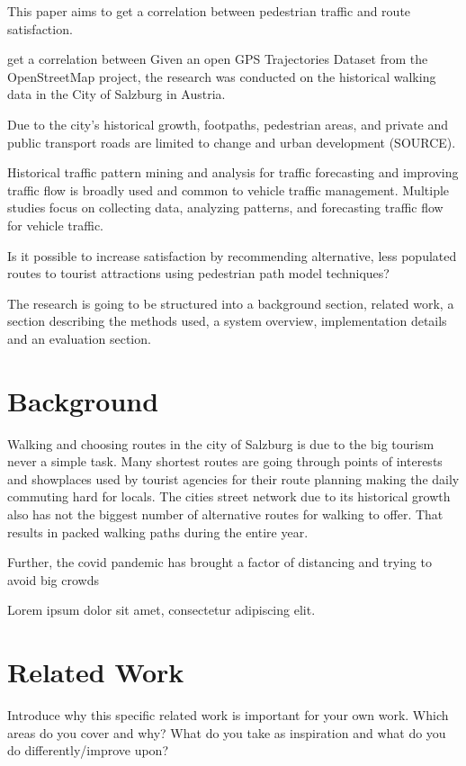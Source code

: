 This paper aims to get a correlation between pedestrian traffic and route satisfaction.


get a correlation between 
Given an open GPS Trajectories Dataset from the OpenStreetMap project, the research was conducted on the historical walking data in the City of Salzburg in Austria. 


Due to the city's historical growth, footpaths, pedestrian areas, and private and public transport roads are limited to change and urban development (SOURCE). 

\autocite[]{Netsch2021}

Historical traffic pattern mining and analysis for traffic forecasting and improving traffic flow is broadly used and common to vehicle traffic management. Multiple studies focus on collecting data, analyzing patterns, and forecasting traffic flow for vehicle traffic. 

Is it possible to increase satisfaction by recommending alternative, less populated routes to tourist attractions using pedestrian path model techniques?

The research is going to be structured into a background section, related work, a section describing the methods used, a system overview, implementation details and an evaluation section.

\section{Background}
Walking and choosing routes in the city of Salzburg is due to the big tourism never a simple task. Many shortest routes are going through points of interests and showplaces used by tourist agencies for their route planning making the daily commuting hard for locals. The cities street network due to its historical growth also has not the biggest number of alternative routes for walking to offer. That results in packed walking paths during the entire year.

Further, the covid pandemic has brought a factor of distancing and trying to avoid big crowds 


Lorem ipsum dolor sit amet, consectetur adipiscing elit. 

\section{Related Work}
Introduce why this specific related work is important for your own work. Which areas do you cover and why? What do you take as inspiration and what do you do differently/improve upon? 

